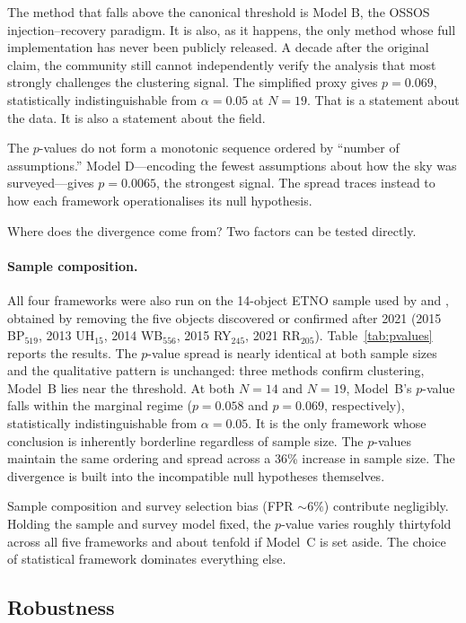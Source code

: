 \documentclass[usenatbib]{mnras}
\begin{document}
The method that falls above the canonical threshold is Model B, the OSSOS injection--recovery paradigm. It is also, as it happens, the only method whose full implementation has never been publicly released. A decade after the original claim, the community still cannot independently verify the analysis that most strongly challenges the clustering signal. The simplified proxy gives $p=0.069$, statistically indistinguishable from $\alpha=0.05$ at $N=19$. That is a statement about the data. It is also a statement about the field.

The $p$-values do not form a monotonic sequence ordered by ``number of assumptions.'' Model D---encoding the fewest assumptions about how the sky was surveyed---gives $p=0.0065$, the strongest signal. The spread traces instead to how each framework operationalises its null hypothesis.

Where does the divergence come from? Two factors can be tested directly.

\paragraph{Sample composition.}
All four frameworks were also run on the 14-object ETNO sample used by \citet{brown2019} and \citet{napier2021}, obtained by removing the five objects discovered or confirmed after 2021 (2015 BP$_{519}$, 2013 UH$_{15}$, 2014 WB$_{556}$, 2015 RY$_{245}$, 2021 RR$_{205}$). Table~\ref{tab:pvalues} reports the results. The $p$-value spread is nearly identical at both sample sizes and the qualitative pattern is unchanged: three methods confirm clustering, Model~B lies near the threshold. At both $N=14$ and $N=19$, Model~B's $p$-value falls within the marginal regime ($p=0.058$ and $p=0.069$, respectively), statistically indistinguishable from $\alpha=0.05$. It is the only framework whose conclusion is inherently borderline regardless of sample size. The $p$-values maintain the same ordering and spread across a 36\% increase in sample size. The divergence is built into the incompatible null hypotheses themselves.

Sample composition and survey selection bias (FPR $\sim6\%$) contribute negligibly. Holding the sample and survey model fixed, the $p$-value varies roughly thirtyfold across all five frameworks and about tenfold if Model~C is set aside. The choice of statistical framework dominates everything else.

\subsection{Robustness}
\end{document}
